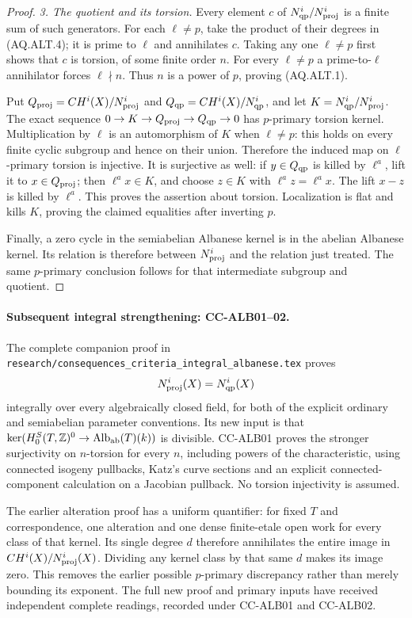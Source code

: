\documentclass[11pt,a4paper]{article}
\theoremstyle{definition}\newtheorem{definition}[theorem]{Definition}
\theoremstyle{remark}\newtheorem{remark}[theorem]{Remark}
\begin{document}
\begin{proof}
\emph{3. The quotient and its torsion.}
Every element $c$ of $N^i_{\rm qp}/N^i_{\rm proj}$
is a finite sum of such generators.  For each
$\ell\ne p$, take the product of their degrees in
(AQ.ALT.4); it is prime to $\ell$ and annihilates $c$.
Taking any one $\ell\ne p$ first shows that $c$ is
torsion, of some finite order $n$.  For every
$\ell\ne p$ a prime-to-$\ell$ annihilator forces
$\ell\nmid n$.  Thus $n$ is a power of $p$, proving
(AQ.ALT.1).

Put $Q_{\rm proj}=CH^i(X)/N^i_{\rm proj}$ and
$Q_{\rm qp}=CH^i(X)/N^i_{\rm qp}$, and let
$K=N^i_{\rm qp}/N^i_{\rm proj}$.
The exact sequence
$0\to K\to Q_{\rm proj}\to Q_{\rm qp}\to0$
has $p$-primary torsion kernel.  Multiplication by
$\ell$ is an automorphism of $K$ when $\ell\ne p$:
this holds on every finite cyclic subgroup and hence
on their union.  Therefore the induced map on
$\ell$-primary torsion is injective.  It is surjective
as well: if $y\in Q_{\rm qp}$ is killed by
$\ell^a$, lift it to $x\in Q_{\rm proj}$;
then $\ell^a x\in K$, and choose $z\in K$ with
$\ell^a z=\ell^a x$.  The lift $x-z$ is killed by
$\ell^a$.  This proves the assertion about torsion.
Localization is flat and kills $K$, proving the
claimed equalities after inverting $p$.

Finally, a zero cycle in the semiabelian Albanese
kernel is in the abelian Albanese kernel.  Its relation
is therefore between $N^i_{\rm proj}$ and the relation
just treated.  The same $p$-primary conclusion follows
for that intermediate subgroup and quotient.
\end{proof}

\paragraph{Subsequent integral strengthening: CC-ALB01--02.}
The complete companion proof in
\texttt{research/consequences\_criteria\_integral\_albanese.tex}
proves
\[
                  N^i_{\rm proj}(X)=N^i_{\rm qp}(X)
\]
integrally over every algebraically closed field, for both
of the explicit ordinary and semiabelian parameter conventions.
Its new input is that
$\ker(H^S_0(T,\mathbb Z)^0\to\operatorname{Alb}_{\rm ab}(T)(k))$
is divisible.  CC-ALB01 proves the stronger surjectivity on
$n$-torsion for every $n$, including powers of the characteristic,
using connected isogeny pullbacks, Katz's curve sections and an
explicit connected-component calculation on a Jacobian pullback.
No torsion injectivity is assumed.

The earlier alteration proof has a uniform quantifier:
for fixed $T$ and correspondence, one alteration and one dense
finite-etale open work for every class of that kernel.  Its
single degree $d$ therefore annihilates the entire image in
$CH^i(X)/N^i_{\rm proj}(X)$.  Dividing any kernel class by
that same $d$ makes its image zero.  This removes the earlier
possible $p$-primary discrepancy rather than merely bounding
its exponent.  The full new proof and primary inputs have
received independent complete readings, recorded under
CC-ALB01 and CC-ALB02.
\end{document}
